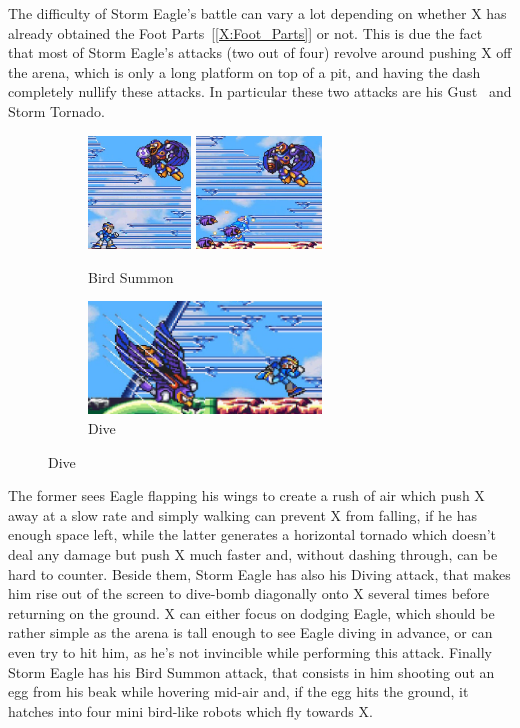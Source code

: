 The difficulty of Storm Eagle's battle can vary a lot depending on whether X has already obtained the Foot Parts~[\ref{X:Foot_Parts}] or not. This is due the fact that most of Storm Eagle's attacks (two out of four) revolve around pushing X off the arena, which is only a long platform on top of a pit, and having the dash completely nullify these attacks. In particular these two attacks are his Gust~\cite{wiki:Storm_eagle} and Storm Tornado.
\begin{figure}[htp]
	\centering
	\begin{subfigure}{\linewidth}
		\centering
		\includegraphics[height=3cm]{figures/X1/Storm_eagle/Eagle_egg_1.jpg}
		\includegraphics[height=3cm]{figures/X1/Storm_eagle/Eagle_egg_2.jpg}
		\caption{Bird Summon}
	\end{subfigure}
	\begin{subfigure}{\linewidth}
		\centering
		\includegraphics[height=3cm]{figures/X1/Storm_eagle/Eagle_dive.jpg}
		\caption{Dive}
	\end{subfigure}
\end{figure}
The former sees Eagle flapping his wings to create a rush of air which push X away at a slow rate and simply walking can prevent X from falling, if he has enough space left, while the latter generates a horizontal tornado which doesn't deal any damage but push X much faster and, without dashing through, can be hard to counter. Beside them, Storm Eagle has also his Diving attack, that makes him rise out of the screen to dive-bomb diagonally onto X several times before returning on the ground. X can either focus on dodging Eagle, which should be rather simple as the arena is tall enough to see Eagle diving in advance, or can even try to hit him, as he's not invincible while performing this attack. Finally Storm Eagle has his Bird Summon attack, that consists in him shooting out an egg from his beak while hovering mid-air and, if the egg hits the ground, it hatches into four mini bird-like robots which fly towards X. 


